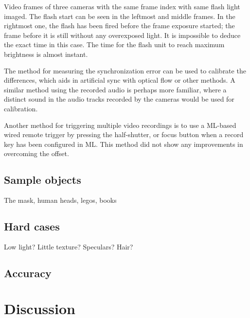 {Video frames of three cameras with the same frame index with same flash light imaged.
The flash start can be seen in the leftmost and middle frames.
In the rightmost one, the flash has been fired before the frame exposure started;
the frame before it is still without any overexposed light.
It is impossible to deduce the exact time in this case.
The time for the flash unit to reach maximum brightness is almost instant.
}

The method for measuring the synchronization error can be used to calibrate the differences, which aids in artificial sync with optical flow or other methods.
A similar method using the recorded audio is perhaps more familiar, where a distinct sound in the audio tracks recorded by the cameras would be used for calibration.

Another method for triggering multiple video recordings is to use a ML-based wired remote trigger by pressing the half-shutter, or focus button when a record key has been configured in ML.
This method did not show any improvements in overcoming the offset.

\subsection{Sample objects}

The mask, human heads, legos, books

\subsection{Hard cases}

Low light? Little texture? Speculars? Hair?


\subsection{Accuracy}

\clearpage

\section{Discussion}

